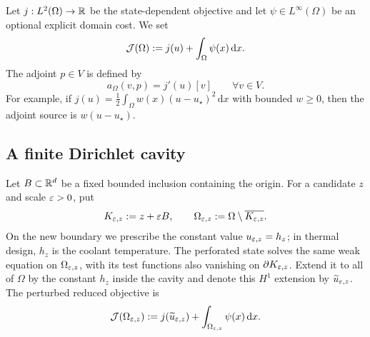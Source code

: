 Let $j:L^2(\Omega)\to\mathbb{R}$ be the state-dependent objective and let
$\psi\in L^\infty(\Omega)$ be an optional explicit domain cost.  We set
\begin{equation}
 \mathcal{J}(\Omega):=j(u)+\int_\Omega\psi(x)\,\mathrm dx.
 \label{eq:baseobjective}
\end{equation}
The adjoint $p\in V$ is defined by
\begin{equation}
 a_\Omega(v,p)=j'(u)[v]
 \qquad\forall v\in V.
 \label{eq:adjointweak}
\end{equation}
For example, if
$j(u)=\tfrac12\int_\Omega w(x)(u-u_\star)^2\,\mathrm dx$ with bounded
$w\ge0$, then the adjoint source is $w(u-u_\star)$.

\subsection{A finite Dirichlet cavity}

Let $B\subset\mathbb{R}^d$ be a fixed bounded inclusion containing the origin.  For a
candidate $z$ and scale $\varepsilon>0$, put
\begin{equation}
 K_{\varepsilon,z}:=z+\varepsilon B,
 \qquad
 \Omega_{\varepsilon,z}:=\Omega\setminus\overline{K_{\varepsilon,z}}.
\end{equation}
On the new boundary we prescribe the constant value
$u_{\varepsilon,z}=h_z$; in thermal design, $h_z$ is the coolant temperature.  The
perforated state solves the same weak equation on $\Omega_{\varepsilon,z}$, with its
test functions also vanishing on $\partial K_{\varepsilon,z}$.  Extend it to all of
$\Omega$ by the constant $h_z$ inside the cavity and denote this $H^1$
extension by $\widetilde u_{\varepsilon,z}$.  The perturbed reduced objective is
\begin{equation}
 \mathcal{J}(\Omega_{\varepsilon,z})
 :=j(\widetilde u_{\varepsilon,z})
   +\int_{\Omega_{\varepsilon,z}}\psi(x)\,\mathrm dx.
 \label{eq:perforatedobjective}
\end{equation}

